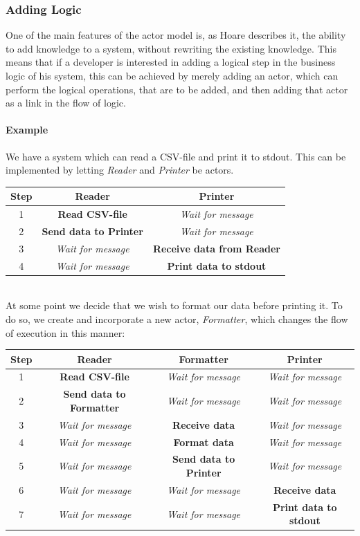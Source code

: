 \subsubsection{Adding Logic}
One of the main features of the actor model is, as Hoare describes it, the ability to add knowledge to a system, without rewriting the existing knowledge. This means that if a developer is interested in adding a logical step in the business logic of his system, this can be achieved by merely adding an actor, which can perform the logical operations, that are to be added, and then adding that actor as a link in the flow of logic.

\paragraph{Example}
We have a system which can read a CSV-file and print it to stdout. This can be implemented by letting \emph{Reader} and \emph{Printer} be actors.

\begin{tabular}{ | c | c | c | }
\hline
Step & Reader & Printer \\\hline
1 & \textbf{Read CSV-file} & \textit{Wait for message} \\\hline
2 & \textbf{Send data to Printer} & \textit{Wait for message}\\\hline
3 & \textit{Wait for message} & \textbf{Receive data from Reader}\\\hline
4 & \textit{Wait for message} & \textbf{Print data to stdout}\\\hline
\end{tabular}\\
At some point we decide that we wish to format our data before printing it. To do so, we create and incorporate a new actor, \emph{Formatter}, which changes the flow of execution in this manner:\\

\begin{tabular}{ | c | c | c | c | }
\hline
Step & Reader & Formatter & Printer \\\hline
1 & \textbf{Read CSV-file} & \textit{Wait for message} & \textit{Wait for message} \\\hline
2 & \textbf{Send data to Formatter} & \textit{Wait for message} & \textit{Wait for message}\\\hline
3 & \textit{Wait for message} & \textbf{Receive data} & \textit{Wait for message} \\\hline
4 & \textit{Wait for message} & \textbf{Format data} & \textit{Wait for message} \\\hline
5 & \textit{Wait for message} & \textbf{Send data to Printer} & \textit{Wait for message} \\\hline
6 & \textit{Wait for message} & \textit{Wait for message} & \textbf{Receive data}\\\hline
7 & \textit{Wait for message} & \textit{Wait for message} & \textbf{Print data to stdout} \\\hline
\end{tabular}\\

